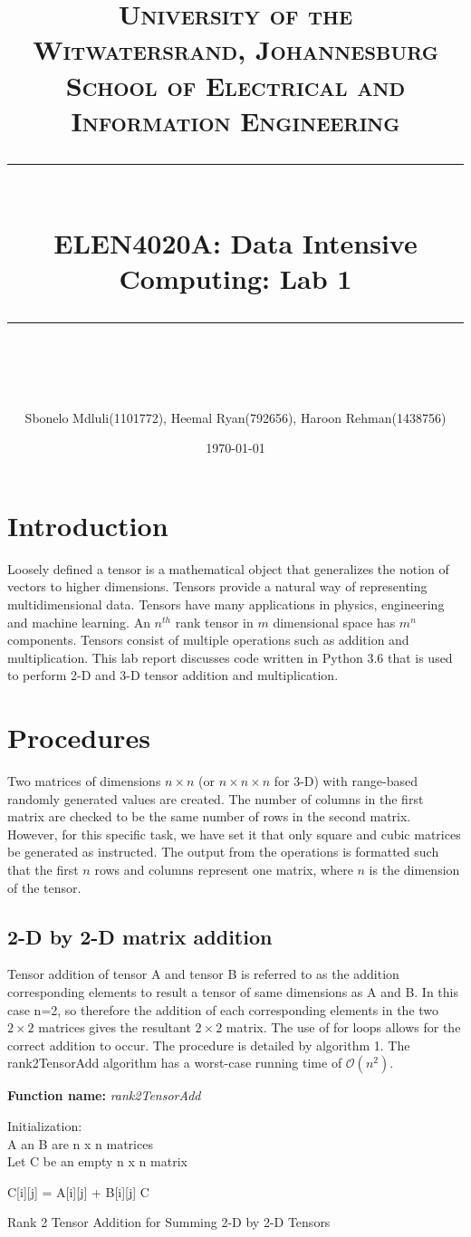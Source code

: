 \documentclass[10pt,journal]{article}
\title{	
	\normalfont\largesize
	\textbf{\textsc{University of the Witwatersrand, Johannesburg}}\\
	\textsc{School of Electrical and Information Engineering}\\ 
	\vspace{5pt} %
	\rule{\linewidth}{0.5pt}\\ %
	\vspace{10pt} %
	{\huge ELEN4020A: Data Intensive Computing: Lab 1}\\ %
	\vspace{1pt} %
	\rule{\linewidth}{2pt}\\ %
	\vspace{1pt} %
}
\author{ Sbonelo Mdluli(1101772), Heemal Ryan(792656), Haroon Rehman(1438756) }
\date{\large\today}
\begin{document}
\maketitle 

\section{Introduction}
Loosely defined a tensor is a mathematical object that generalizes the notion of vectors to higher dimensions. Tensors provide a natural way of representing multidimensional data. Tensors have many applications in physics, engineering and machine learning. An $n^{th}$ rank tensor in $m$ dimensional space has $m^{n}$ components. Tensors consist of multiple operations such as addition and multiplication. This lab report discusses code written in Python 3.6 that is used to perform 2-D and 3-D tensor addition and multiplication.

\section{Procedures}
Two matrices of dimensions $n\times n$ (or $n\times n\times n$  for 3-D) with range-based randomly generated values are created. The number of columns in the first matrix are checked to be the same number of rows in the second matrix. However, for this specific task, we have set it that only square and cubic matrices be generated as instructed. The output from the operations is formatted such that the first $n$ rows and columns represent one matrix, where $n$ is the dimension of the tensor.

\subsection{2-D by 2-D matrix addition}
Tensor addition of tensor A and tensor B is referred to as the addition corresponding elements to result a tensor of same dimensions as A and B. In this case n=2, so therefore the addition of each corresponding elements in the two  $2\times 2$ matrices gives the resultant  $2\times 2$ matrix. The use of for loops allows for the correct addition to occur. The procedure is detailed by algorithm 1. The rank2TensorAdd algorithm has a worst-case running time of $\mathcal{O}(n^2)$.
\newline 
\begin{algorithm}[H]
\SetAlgoLined
\textbf{Function name:} \emph{rank2TensorAdd}

Initialization\::\\ 
 A an B are n x n matrices\\
 Let C be an empty n x n matrix

    {
        {C[i][j] = A[i][j] + B[i][j]}}
 \Return C
 
\caption{Rank 2 Tensor Addition for Summing 2-D by 2-D Tensors}
\end{algorithm}
\end{document}
